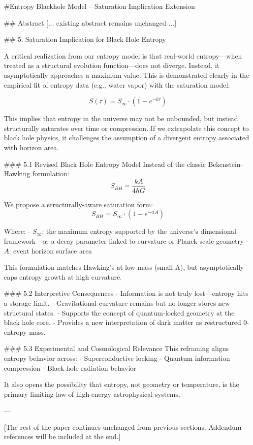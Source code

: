 #Entropy Blackhole Model – Saturation Implication Extension

## Abstract
[... existing abstract remains unchanged ...]

## 5. Saturation Implication for Black Hole Entropy

A critical realization from our entropy model is that real-world entropy—when treated as a structural evolution function—does not diverge. Instead, it asymptotically approaches a maximum value. This is demonstrated clearly in the empirical fit of entropy data (e.g., water vapor) with the saturation model:

\[
S(\tau) = S_{\infty} \cdot \left(1 - e^{-k \tau} \right)
\]

This implies that entropy in the universe may not be unbounded, but instead structurally saturates over time or compression. If we extrapolate this concept to black hole physics, it challenges the assumption of a divergent entropy associated with horizon area.

### 5.1 Revised Black Hole Entropy Model
Instead of the classic Bekenstein-Hawking formulation:
\[
S_{BH} = \frac{k A}{4 \hbar G}
\]

We propose a structurally-aware saturation form:
\[
S_{BH} = S_{\infty} \cdot \left(1 - e^{-\alpha A} \right)
\]

Where:
- \( S_{\infty} \): the maximum entropy supported by the universe’s dimensional framework
- \( \alpha \): a decay parameter linked to curvature or Planck-scale geometry
- \( A \): event horizon surface area

This formulation matches Hawking’s at low mass (small A), but asymptotically caps entropy growth at high curvature.

### 5.2 Interpretive Consequences
- Information is not truly lost—entropy hits a storage limit.
- Gravitational curvature remains but no longer stores new structural states.
- Supports the concept of quantum-locked geometry at the black hole core.
- Provides a new interpretation of dark matter as restructured 0-entropy mass.

### 5.3 Experimental and Cosmological Relevance
This reframing aligns entropy behavior across:
- Superconductive locking
- Quantum information compression
- Black hole radiation behavior

It also opens the possibility that entropy, not geometry or temperature, is the primary limiting law of high-energy astrophysical systems.

---

[The rest of the paper continues unchanged from previous sections. Addendum references will be included at the end.]
